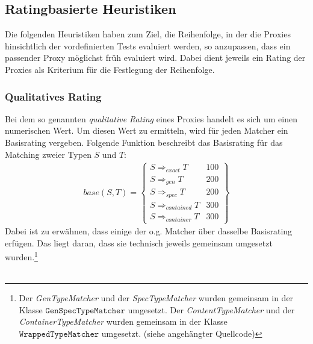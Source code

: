 \documentclass[a4paper,12pt]{article}
\begin{document}
\subsection{Ratingbasierte Heuristiken}
Die folgenden Heuristiken haben zum Ziel, die Reihenfolge, in der die Proxies hinsichtlich der vordefinierten Tests evaluiert werden, so anzupassen, dass ein passender Proxy möglichst früh evaluiert wird. Dabei dient jeweils ein Rating der Proxies als Kriterium für die Festlegung der Reihenfolge.


\subsubsection{Qualitatives Rating}
Bei dem so genannten \emph{qualitative Rating} eines Proxies handelt es sich um einen numerischen Wert. Um diesen Wert zu ermitteln, wird für jeden Matcher ein Basisrating vergeben. Folgende Funktion beschreibt das Basisrating für das Matching zweier Typen $S$ und $T$:
\begin{gather*}
\mathit{base(S,T)} =  \left\{ 
				\begin{array}{l|l}
					S \Rightarrow_{exact}  T  & 100 \\
					S \Rightarrow_{gen}  T  & 200 \\
					S \Rightarrow_{spec}  T  & 200 \\
					S \Rightarrow_{contained}  T  & 300 \\
					S \Rightarrow_{container}  T  & 300 					
				\end{array}
              \right\}
\end{gather*}
\noindent
Dabei ist zu erwähnen, dass einige der o.g. Matcher über dasselbe Basisrating erfügen. Das liegt daran, dass sie technisch jeweils gemeinsam umgesetzt wurden.\footnote{Der \emph{GenTypeMatcher} und der \emph{SpecTypeMatcher} wurden gemeinsam in der Klasse $\texttt{GenSpecTypeMatcher}$ umgesetzt. Der \emph{ContentTypeMatcher} und der \emph{ContainerTypeMatcher} wurden gemeinsam in der Klasse $\texttt{WrappedTypeMatcher}$ umgesetzt. (siehe angehängter Quellcode)}\\\\
\end{document}
